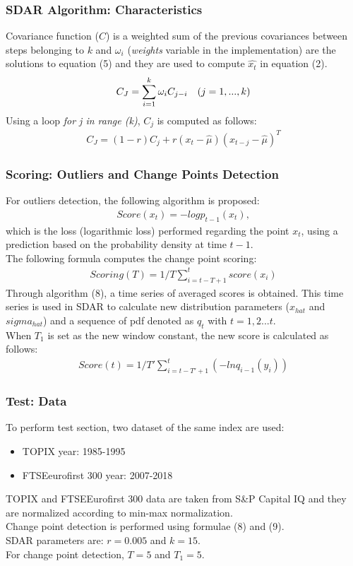 \documentclass[aspectratio=1610]{beamer}
\begin{document}
\begin{frame}
	\frametitle{SDAR Algorithm: Characteristics}
	Covariance function ($C$) is a weighted sum of the previous covariances between steps belonging to $k$ and $\omega_i$ (\textit{weights} variable in the implementation) are the solutions to equation (5) and they are used to compute $\hat{x_t}$ in equation (2).
\begin{eqnarray}
C_J=\sum_{i=1}^k\omega_iC_{j-i}\hspace{0.35cm}(j=1,...,k)
\end{eqnarray}
Using a loop \textit{for j in range (k)}, $C_j$ is computed as follows:
\begin{eqnarray}
C_J = (1-r)C_j+r(x_t-\hat{\mu})(x_{t-j}-\hat{\mu})^T
\end{eqnarray}
\end{frame}
\begin{frame}
	\frametitle{Scoring: Outliers and Change Points Detection}
	For outliers detection, the following algorithm is proposed:
	\begin{eqnarray}
	Score(x_t)= -logp_{t-1}(x_t),
	\end{eqnarray} 
	which is the loss (logarithmic loss) performed regarding the point $x_t$, using a prediction based on the probability density at time $t-1$.
	\\The following formula computes the change point scoring: 
	\begin{eqnarray}
	Scoring(T)= 1/T\sum_{i=t-T+1}^t score(x_i)
	\end{eqnarray}
	Through algorithm (8), a time series of averaged scores is obtained. This time series is used in SDAR to calculate new distribution parameters ($x_{hat}$ and $sigma_{hat}$) and a sequence of pdf denoted as $q_t$ with $t=1,2...t$.\\
	When $T_1$ is set as the new window constant, the new score is calculated as follows:
	\begin{eqnarray}
	Score(t)= 1/T'\sum_{i=t-T'+1}^t (-lnq_{i-1}(y_i))
	\end{eqnarray}
\end{frame}
\begin{frame}
	\frametitle{Test: Data}
	To perform test section, two dataset of the same index are used:
	\begin{itemize}
		\item TOPIX year: 1985-1995
		\item FTSEeurofirst 300 year: 2007-2018
	\end{itemize}
TOPIX and FTSEEurofirst 300 data are taken from S\&P Capital IQ  and they are normalized according to min-max normalization.
\\Change point detection is performed using formulae (8) and (9).\\
SDAR parameters are: $r=0.005$ and $k=15$. 
\\For change point detection, $T=5$ and $T_1 = 5$.
	
\end{frame}
\end{document}

